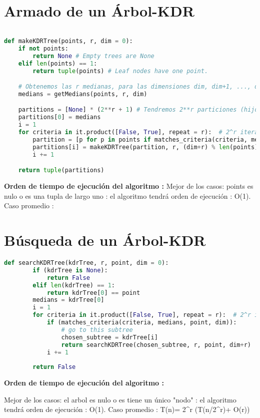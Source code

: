 
\section{Armado de un Árbol-KDR}
\begin{lstlisting}[language=Python]
	
def makeKDRTree(points, r, dim = 0):
	if not points:
		return None # Empty trees are None
	elif len(points) == 1:
		return tuple(points) # Leaf nodes have one point.

	# Obtenemos las r medianas, para las dimensiones dim, dim+1, ..., dim+(r-1)
	medians = getMedians(points, r, dim)

	partitions = [None] * (2**r + 1) # Tendremos 2**r particiones (hijos)
	partitions[0] = medians
	i = 1
	for criteria in it.product([False, True], repeat = r):  # 2^r iteraciones
		partition = [p for p in points if matches_criteria(criteria, medians, p, dim)] # n iteraciones
		partitions[i] = makeKDRTree(partition, r, (dim+r) % len(points))
		i += 1

	return tuple(partitions)
	\end{lstlisting}
\textbf{ Orden de tiempo de ejecución del algoritmo : }
{Mejor de los casos: points es nulo o es una tupla de largo uno : 
el algoritmo tendrá orden de ejecución : O(1).
Caso promedio : 
}


	\section{Búsqueda de un Árbol-KDR}
	\begin{lstlisting}[language=Python]
	def searchKDRTree(kdrTree, r, point, dim = 0):
		if (kdrTree is None):
			return False
		elif len(kdrTree) == 1:
			return kdrTree[0] == point
		medians = kdrTree[0]
		i = 1
		for criteria in it.product([False, True], repeat = r):  # 2^r iteraciones
			if (matches_criteria(criteria, medians, point, dim)):
				# go to this subtree
				chosen_subtree = kdrTree[i]
				return searchKDRTree(chosen_subtree, r, point, dim+r)
			i += 1
	
		return False
		\end{lstlisting}
	\textbf{ Orden de tiempo de ejecución del algoritmo : }
		{Mejor de los casos: el arbol es nulo o es tiene un único "nodo" : 
		el algoritmo tendrá orden de ejecución : O(1).
		Caso promedio : T(n)= 2^r (T(n/2^r)+ O(r))
		
		
		
		}



